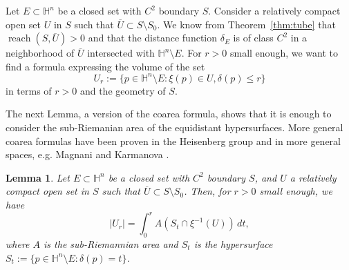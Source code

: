 \documentclass[10pt]{amsart}
\newtheorem{lemma}[theorem]{Lemma}
\theoremstyle{definition}
\theoremstyle{remark}
\numberwithin{equation}{section}
\begin{document}
Let $E\subset{{\mathbb{H}}}^n$ be a closed set with $C^2$ boundary $S$. Consider a relatively compact open set $U$ in $S$ such that $\overline{U}\subset S\setminus S_0$. We know from Theorem~\ref{thm:tube} that $\operatorname{reach}(S,\overline{U})>0$ and that the distance function $\delta_E$ is of class $C^2$ in a neighborhood of $\overline{U}$ intersected with ${{\mathbb{H}}}^n\setminus E$. For $r>0$ small enough, we want to find a formula expressing the volume of the set
\[
U_r:=\{p\in{{\mathbb{H}}}^n\setminus E: \xi(p)\in U, \delta(p){\leqslant} r\}
\]
in terms of $r>0$ and the geometry of $S$.

The next Lemma, a version of the coarea formula, shows that it is enough to consider the sub-Riemanian area of the equidistant hypersurfaces. More general coarea formulas have been proven in the Heisenberg group and in more general spaces, e.g. Magnani \cite{MR1874099} and Karmanova \cite{MR2498573}.

\begin{lemma}
Let $E\subset{{\mathbb{H}}}^n$ be a closed set with $C^2$ boundary $S$, and $U$ a relatively compact open set in $S$ such that $\overline{U}\subset S\setminus S_0$. Then, for $r>0$ small enough, we have
\begin{equation}
\label{eq:volumeur}
|U_r|=\int_0^r A(S_t\cap\xi^{-1}(U))\,dt,
\end{equation}
where $A$ is the sub-Riemannian area and $S_t$ is the hypersurface $S_t:=\{p\in{{\mathbb{H}}}^n\setminus E: \delta(p)=t\}$.
\end{lemma}
\end{document}
